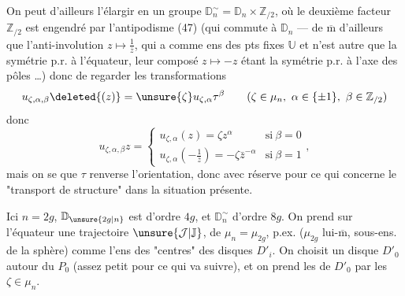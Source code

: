 
On peut d'ailleurs l'élargir en un groupe
$\mathbb D_n^\sim=\mathbb D_n\times\mathbb Z_{/2}$,
où le deuxième facteur $\mathbb Z_{/2}$ est engendré par l'antipodisme (47)
(qui commute à $\mathbb D_n$ --- de $\overline{\mathrm m}$ d'ailleurs
que l'anti-involution $z\longmapsto\frac{1}{\bar z}$, qui a comme
ens des pts fixes $\mathbb U$ et n'est autre que la symétrie p.r. à
l'équateur, leur composé $z\longmapsto-z$ étant la symétrie p.r. à
l'axe des pôles \ldots) donc de regarder les transformations
\[
u_{\zeta,\alpha,\beta}\deleted{(z)}=\unsure{\zeta}u_{\zeta,\alpha}\tau^\beta
\qquad
(\zeta\in\mu_n,\ \alpha\in\{\pm1\},\ \beta\in\mathbb Z_{/2})
\]
donc
\[
u_{\zeta,\alpha,\beta}z=
\begin{cases}
u_{\zeta,\alpha}(z)=\zeta z^\alpha&\mathrm{si}\ \beta=0\\
u_{\zeta,\alpha}(-\frac{1}{\bar z})=-\zeta\bar z^{-\alpha}
&\mathrm{si}\ \beta=1
\end{cases},
\]
mais on se  que $\tau$ renverse l'orientation,
donc 
 avec
réserve pour ce qui concerne le "transport de structure" dans
la situation présente.

Ici $n=2g$, $\mathbb D_{\unsure{2g|n}}$ est d'ordre $4g$, et
$\mathbb D_n^\sim$ d'ordre $8g$. On prend sur l'équateur une
trajectoire $\unsure{\mathcal J|\mathbb J}$, de $\mu_n=\mu_{2g}$, p.ex.
 
 ($\mu_{2g}$
lui-$\overline{\mathrm m}$, 
 sous-ens. de la sphère) comme l'ens des "centres"
des disques $D'_i$. On choisit un disque $D'_0$ autour du
 $P_0$ (assez petit pour ce qui va suivre), et on
prend les  de $D'_0$ par les
$\zeta\in\mu_n$.




